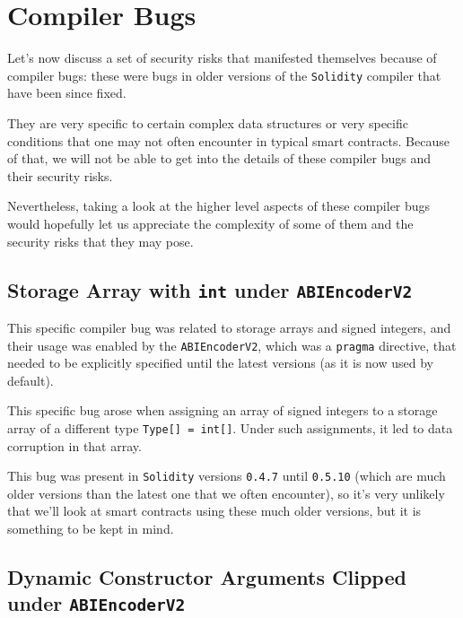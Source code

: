 \section{Compiler Bugs}\label{compiler-bugs}

Let's now discuss a set of security risks that manifested themselves
because of compiler bugs: these were bugs in older versions of the
\texttt{Solidity} compiler that have been since fixed.

They are very specific to certain complex data structures or very
specific conditions that one may not often encounter in typical smart
contracts. Because of that, we will not be able to get into the details
of these compiler bugs and their security risks.

Nevertheless, taking a look at the higher level aspects of these
compiler bugs would hopefully let us appreciate the complexity of some
of them and the security risks that they may pose.

\subsection{\texorpdfstring{Storage Array with \texttt{int} under
\texttt{ABIEncoderV2}}{Storage Array with int under ABIEncoderV2}}\label{storage-array-with-int-under-abiencoderv2}

This specific compiler bug was related to storage arrays and signed
integers, and their usage was enabled by the \texttt{ABIEncoderV2},
which was a \texttt{pragma} directive, that needed to be explicitly
specified until the latest versions (as it is now used by default).

This specific bug arose when assigning an array of signed integers to a
storage array of a different type \texttt{Type{[}{]}\ =\ int{[}{]}}.
Under such assignments, it led to data corruption in that array.

This bug was present in \texttt{Solidity} versions \texttt{0.4.7} until
\texttt{0.5.10} (which are much older versions than the latest one that
we often encounter), so it's very unlikely that we'll look at smart
contracts using these much older versions, but it is something to be
kept in mind.

\subsection{\texorpdfstring{Dynamic Constructor Arguments Clipped under
\texttt{ABIEncoderV2}}{Dynamic Constructor Arguments Clipped under ABIEncoderV2}}\label{dynamic-constructor-arguments-clipped-under-abiencoderv2}

